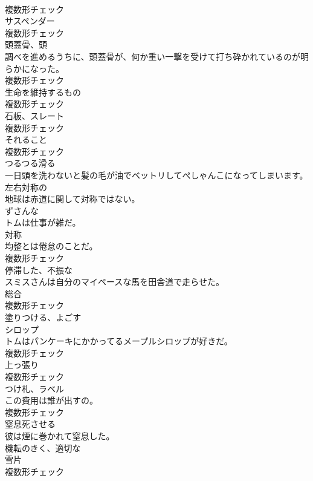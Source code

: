 \documentclass[8pt]{extreport}
\begin{document}
\begin{CJK}{UTF8}{min}
\\	複数形チェック
\\	[名詞]	サスペンダー	
\\	複数形チェック
\\	[名詞]	頭蓋骨、頭	
\\	調べを進めるうちに、頭蓋骨が、何か重い一撃を受けて打ち砕かれているのが明らかになった。	
\\	複数形チェック
\\	[名詞]	生命を維持するもの	
\\	複数形チェック
\\	[名詞]	石板、スレート	
\\	複数形チェック
\\	[名詞]	それること	
\\	複数形チェック
\\	[形容詞]	つるつる滑る	
\\	一日頭を洗わないと髪の毛が油でベットリしてぺしゃんこになってしまいます。	
\\	[形容詞]	左右対称の	
\\	地球は赤道に関して対称ではない。	
\\	[形容詞]	ずさんな	
\\	トムは仕事が雑だ。	
\\	[名詞]	対称	
\\	均整とは倦怠のことだ。	
\\	複数形チェック
\\	[形容詞]	停滞した、不振な	
\\	スミスさんは自分のマイペースな馬を田舎道で走らせた。	
\\	[名詞]	総合	
\\	複数形チェック
\\	[動詞]	塗りつける、よごす	
\\	[名詞]	シロップ	
\\	トムはパンケーキにかかってるメープルシロップが好きだ。	
\\	複数形チェック
\\	[名詞]	上っ張り	
\\	複数形チェック
\\	[名詞]	つけ札、ラベル	
\\	この費用は誰が出すの。	
\\	複数形チェック
\\	[動詞]	窒息死させる	
\\	彼は煙に巻かれて窒息した。	
\\	[形容詞]	機転のきく、適切な	
\\	[名詞]	雪片	
\\	複数形チェック

\end{CJK}
\end{document}
